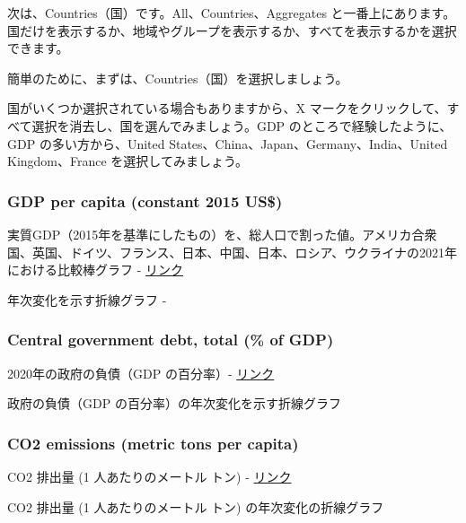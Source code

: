 \documentclass[
  xelatex, ja=standard]{bxjsbook}
\theoremstyle{definition}
\theoremstyle{definition}
\theoremstyle{definition}
\theoremstyle{definition}
\theoremstyle{remark}
\begin{document}
次は、Countries（国）です。All、Countries、Aggregates と一番上にあります。国だけを表示するか、地域やグループを表示するか、すべてを表示するかを選択できます。

簡単のために、まずは、Countries（国）を選択しましょう。

国がいくつか選択されている場合もありますから、X マークをクリックして、すべて選択を消去し、国を選んでみましょう。GDP のところで経験したように、GDP の多い方から、United States、China、Japan、Germany、India、United Kingdom、France を選択してみましょう。

\hypertarget{gdp-per-capita-constant-2015-us}{%
\subsubsection{GDP per capita (constant 2015 US\$)}\label{gdp-per-capita-constant-2015-us}}

実質GDP（2015年を基準にしたもの）を、総人口で割った値。アメリカ合衆国、英国、ドイツ、フランス、日本、中国、日本、ロシア、ウクライナの2021年における比較棒グラフ - \href{https://data.worldbank.org/indicator/NY.GDP.PCAP.KD?locations=JP-GB-RU-FR-CN-US-UA-DE\&start=2021\&end=2021\&view=bar}{リンク}

年次変化を示す折線グラフ -

\hypertarget{central-government-debt-total-of-gdp}{%
\subsubsection{Central government debt, total (\% of GDP)}\label{central-government-debt-total-of-gdp}}

2020年の政府の負債（GDP の百分率）- \href{https://data.worldbank.org/indicator/GC.DOD.TOTL.GD.ZS?locations=JP-GB-RU-FR-CN-US-UA-DE\&start=2020\&end=2020\&view=bar}{リンク}

政府の負債（GDP の百分率）の年次変化を示す折線グラフ

\hypertarget{co2-emissions-metric-tons-per-capita}{%
\subsubsection{CO2 emissions (metric tons per capita)}\label{co2-emissions-metric-tons-per-capita}}

CO2 排出量 (1 人あたりのメートル トン) - \href{https://data.worldbank.org/indicator/EN.ATM.CO2E.PC?locations=JP-GB-RU-FR-CN-US-UA-DE\&start=2019\&end=2019\&view=bar}{リンク}

CO2 排出量 (1 人あたりのメートル トン) の年次変化の折線グラフ
\end{document}
